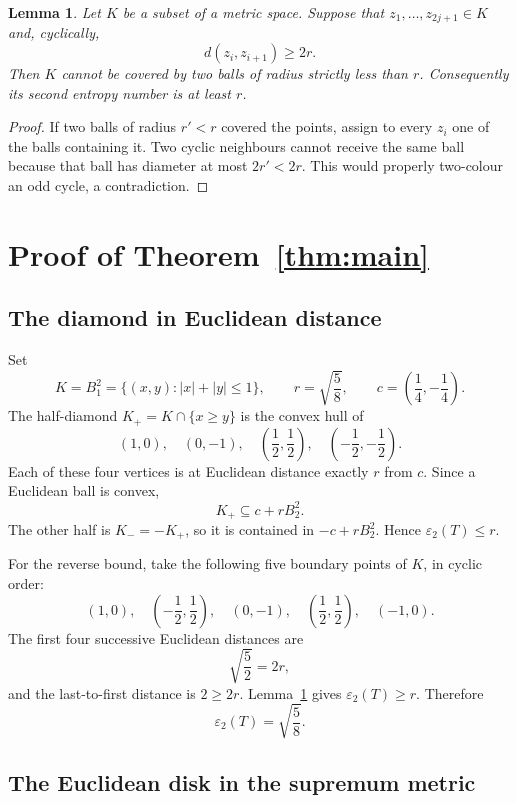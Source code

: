 \documentclass[11pt]{article}
\newtheorem{lemma}[theorem]{Lemma}
\newcommand{\eps}{\varepsilon}
\begin{document}
\begin{lemma}\label{lem:cycle}
Let $K$ be a subset of a metric space.  Suppose that
$z_1,\dots,z_{2j+1}\in K$ and, cyclically,
\[
                    d(z_i,z_{i+1})\ge 2r.
\]
Then $K$ cannot be covered by two balls of radius strictly less than $r$.
Consequently its second entropy number is at least $r$.
\end{lemma}

\begin{proof}
If two balls of radius $r'<r$ covered the points, assign to every $z_i$ one
of the balls containing it.  Two cyclic neighbours cannot receive the same
ball because that ball has diameter at most $2r'<2r$.  This would properly
two-colour an odd cycle, a contradiction.
\end{proof}

\section{Proof of Theorem~\ref{thm:main}}

\subsection{The diamond in Euclidean distance}

Set
\[
              K=B_1^2=\{(x,y):|x|+|y|\le1\},
              \qquad r=\sqrt{\frac58},
              \qquad c=\left(\frac14,-\frac14\right).
\]
The half-diamond $K_+=K\cap\{x\ge y\}$ is the convex hull of
\[
 (1,0),\quad(0,-1),\quad
 \left(\frac12,\frac12\right),\quad
 \left(-\frac12,-\frac12\right).
\]
Each of these four vertices is at Euclidean distance exactly $r$ from $c$.
Since a Euclidean ball is convex,
\[
                         K_+\subseteq c+rB_2^2.
\]
The other half is $K_-=-K_+$, so it is contained in $-c+rB_2^2$.  Hence
$\eps_2(T)\le r$.

For the reverse bound, take the following five boundary points of $K$, in
cyclic order:
\[
 (1,0),\quad
 \left(-\frac12,\frac12\right),\quad
 (0,-1),\quad
 \left(\frac12,\frac12\right),\quad
 (-1,0).
\]
The first four successive Euclidean distances are
\[
                         \sqrt{\frac52}=2r,
\]
and the last-to-first distance is $2\ge2r$.  Lemma~\ref{lem:cycle} gives
$\eps_2(T)\ge r$.  Therefore
\[
                         \eps_2(T)=\sqrt{\frac58}.
\]

\subsection{The Euclidean disk in the supremum metric}
\end{document}
